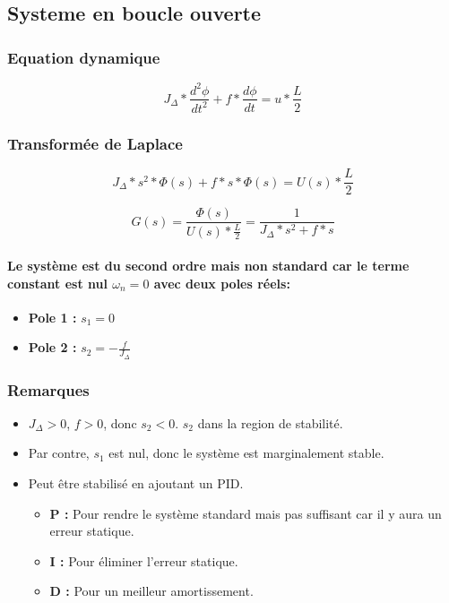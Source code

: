 \subsection{Systeme en boucle ouverte}

\subsubsection{Equation dynamique}

\begin{equation}
	J_\Delta * \frac{d^2\phi}{dt^2} + f * \frac{d\phi}{dt} = u * \frac{L}{2}
\end{equation}

\subsubsection{Transformée de Laplace}

\begin{equation}
	J_\Delta * s^2 * \Phi(s) + f * s * \Phi(s) = U(s) * \frac{L}{2}
\end{equation}

\begin{equation}
	G(s) = \frac{\Phi(s)}{U(s) * \frac{L}{2}} = \frac{1}{J_\Delta * s^2 + f * s}
\end{equation}

\paragraph{Le système est du second ordre mais non standard car le terme constant est nul $\omega_n = 0$ avec deux poles réels:}

\begin{itemize}
	\item \textbf{Pole 1 :} $s_1 = 0$
	\item \textbf{Pole 2 :} $s_2 = -\frac{f}{J_\Delta}$
\end{itemize}

\subsubsection{Remarques}

\begin{itemize}
	\item $J_\Delta > 0$, $f > 0$, donc $s_2 < 0$. $s_2$ dans la region de stabilité.
	\item Par contre, $s_1$ est nul, donc le système est marginalement stable.
	\item Peut être stabilisé en ajoutant un PID.
	\begin{itemize}
		\item \textbf{P :} Pour rendre le système standard mais pas suffisant car il y aura un erreur statique.
		\item \textbf{I :} Pour éliminer l'erreur statique.
		\item \textbf{D :} Pour un meilleur amortissement.
	\end{itemize}
\end{itemize}


